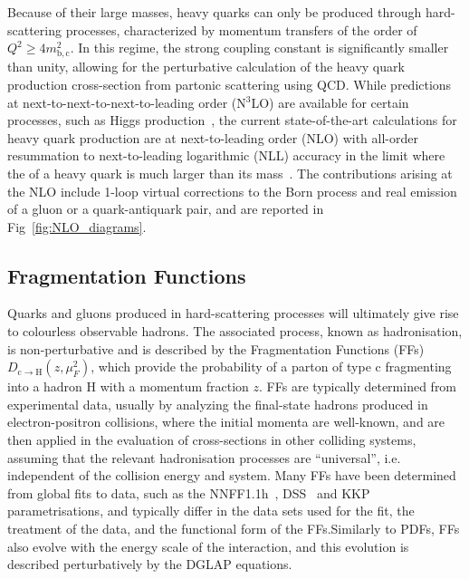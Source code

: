 Because of their large masses, heavy quarks can only be produced through hard-scattering processes, characterized by momentum transfers of the order of $Q^2 \geq 4m^2_\mathrm{b,c}$. In this regime, the strong coupling constant is significantly smaller than unity, allowing for the perturbative calculation of the heavy quark production cross-section from partonic scattering using QCD. While predictions at next-to-next-to-next-to-leading order (N$^3$LO) are available for certain processes, such as Higgs production~\cite{Anastasiou:2015vya, Anastasiou:2016cez}, the current state-of-the-art calculations for heavy quark production are at next-to-leading order (NLO) with all-order resummation to next-to-leading logarithmic (NLL) accuracy in the limit where the \pt of a heavy quark is much larger than its mass~\cite{Cacciari:1998it}. The contributions arising at the NLO include 1-loop virtual corrections to the Born process and real emission of a gluon or a quark-antiquark pair, and are reported in Fig~\ref{fig:NLO_diagrams}.

\subsection{Fragmentation Functions}
Quarks and gluons produced in hard-scattering processes will ultimately give rise to colourless observable hadrons. The associated process, known as hadronisation, is non-perturbative and is described by the Fragmentation Functions (FFs) $D_\mathrm{c\rightarrow H}(z,\mu_F^2)$, which provide the probability of a parton of type c fragmenting into a hadron H with a momentum fraction $z$. FFs are typically determined from experimental data, usually by analyzing the final-state hadrons produced in electron-positron collisions, where the initial momenta are well-known, and are then applied in the evaluation of cross-sections in other colliding systems, assuming that the relevant hadronisation processes are “universal”, i.e. independent of the collision energy and system. Many FFs have been determined from global fits to data, such as the NNFF1.1h~\cite{Bertone:2018ecm}, DSS~\cite{deFlorian:2007aj} and KKP~\cite{Kniehl:2000fe} parametrisations, and typically differ in the data sets used for the fit, the treatment of the data, and the functional form of the FFs.Similarly to PDFs, FFs also evolve with the energy scale of the interaction, and this evolution is described perturbatively by the DGLAP equations. 

